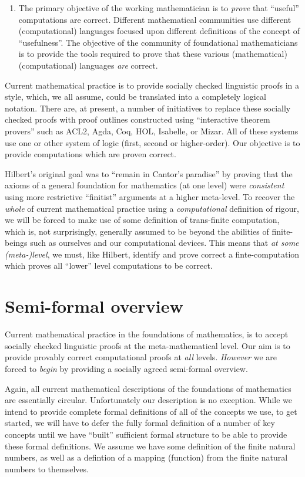 \begin{enumerate}
\item	The primary objective of the working mathematician is to \emph{prove} that
``useful'' computations are correct. Different mathematical communities use
different (computational) languages focused upon different definitions of the
concept of ``usefulness''. The objective of the community of foundational
mathematicians is to provide the tools required to prove that these various
(mathematical) (computational) languages \emph{are} correct.

\end{enumerate}

Current mathematical practice is to provide socially checked linguistic proofs
in a style, which, we all assume, could be translated into a completely logical
notation. There are, at present, a number of initiatives to replace these
socially checked proofs with proof outlines constructed using ``interactive
theorem provers'' such as ACL2, Agda, Coq, HOL, Isabelle, or Mizar. All of these
systems use one or other system of logic (first, second or higher-order). 
Our objective is to provide computations which are proven correct. 

Hilbert's original goal was to ``remain in Cantor's paradise'' by proving that
the axioms of a general foundation for mathematics (at one level) were
\emph{consistent} using more restrictive ``finitist'' arguments at a higher
meta-level. To recover the \emph{whole} of current mathematical practice using a
\emph{computational} definition of rigour, we will be forced to make use of some
definition of trans-finite computation, which is, not surprisingly, generally
assumed to be beyond the abilities of finite-beings such as ourselves and our
computational devices. This means that \emph{at some (meta-)level}, we must,
like Hilbert, identify and prove correct a finte-computation which proves all
``lower'' level computations to be correct.

\section{Semi-formal overview}

Current mathematical practice in the foundations of mathematics, is to accept
socially checked linguistic proofs at the meta-mathematical level. Our aim is to
provide provably correct computational proofs at \emph{all} levels.
\emph{However} we are forced to \emph{begin} by providing a socially agreed
semi-formal overview.

Again, all current mathematical descriptions of the foundations of mathematics
are essentially circular. Unfortunately our description is no exception. While
we intend to provide complete formal definitions of all of the concepts we use,
to get started, we will have to defer the fully formal definition of a number of
key concepts until we have ``built'' sufficient formal structure to be able to
provide these formal definitions. We assume we have some definition of the
finite natural numbers, as well as a defintion of a mapping (function) from the
finite natural numbers to themselves.

